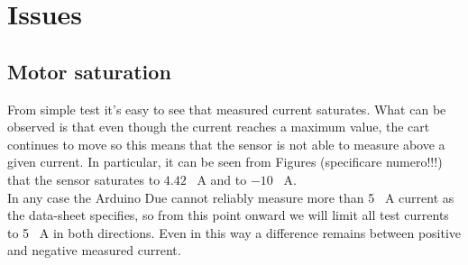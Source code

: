 \section{Issues}
\subsection{Motor saturation}
From simple test it’s easy to see that measured current saturates. What can be observed is that even though the current reaches a maximum value, the cart continues to move so this means that the sensor is not able to measure above a given current. In particular, it can be seen from Figures (specificare numero!!!) that the sensor saturates to $4.42$ \SI{}{\ampere} and to $-10$ \SI{}{\ampere}.\\
In any case the Arduino Due cannot reliably measure more than 5 \SI{}{\ampere} current as the data-sheet specifies, so from this point onward we will limit all test currents to 5 \SI{}{\ampere} in both directions. Even in this way a difference remains between positive and negative measured current.  
